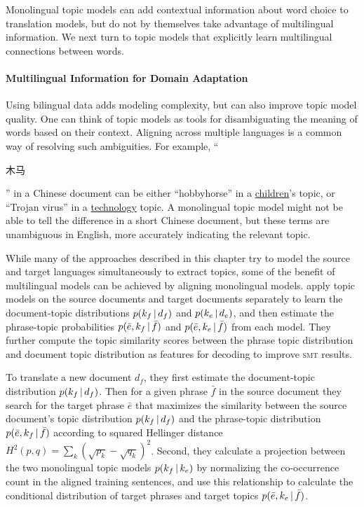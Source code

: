 Monolingual topic models can add contextual information about word choice to 
translation models, but do not by themselves take advantage of multilingual information.
We next turn to topic models that explicitly learn multilingual connections between words.

\paragraph{Multilingual Information for Domain Adaptation}

Using bilingual data adds modeling complexity, but can also improve topic model quality.
One can think of topic models as tools for disambiguating the meaning of words based on their context. 
Aligning across multiple languages is a common way of resolving such ambiguities.
 For example, ``\begin{CJK*}{UTF8}{gbsn}木马\end{CJK*}'' in a Chinese
  document can be either ``hobbyhorse'' in a \underline{children}'s
  topic, or ``Trojan virus'' in a \underline{technology} topic.  
  A monolingual topic model might not be able to tell the difference in a short Chinese document, but these terms
  are unambiguous in English, more accurately indicating the relevant topic.


While many of the approaches described in this chapter try to model the source and target
languages simultaneously to extract topics, some of the benefit of multilingual models can be achieved by aligning monolingual models. \citet{xiao-12} apply
topic models on the source documents and target documents separately
to learn the document-topic distributions $p(k_f \, | \, d_f)$ and $p(k_e \, | \,
d_e)$, and then estimate the phrase-topic probabilities $p(\bar{e}, k_f
\, | \, \bar{f})$ and $p(\bar{e}, k_e \, | \, \bar{f})$ from each model. They further
compute the topic similarity scores between the phrase topic
distribution and document topic distribution as features for decoding
to improve \textsc{smt} results.

To translate a new document $d_f$, they first estimate the document-topic distribution $p(k_f \, | \,
d_f)$.
Then for a given phrase $\bar{f}$ in the source document they search
for the target phrase $\bar{e}$ that maximizes the similarity between
the source document's topic distribution $p(k_f \, | \, d_f)$ and the
phrase-topic distribution $p(\bar{e}, k_f \, | \, \bar{f})$ according to
squared Hellinger distance $H^2(p, q) = \sum_k \left(\sqrt{p_k} - \sqrt{q_k} \right)^2$.
Second, they calculate a projection between the two monolingual topic models $p(k_f
\, | \, k_e)$  by normalizing the co-occurrence count in the aligned training
sentences, and use this relationship to calculate the conditional
distribution of target phrases and target topics $p(\bar{e}, k_e \, | \, \bar{f})$.

